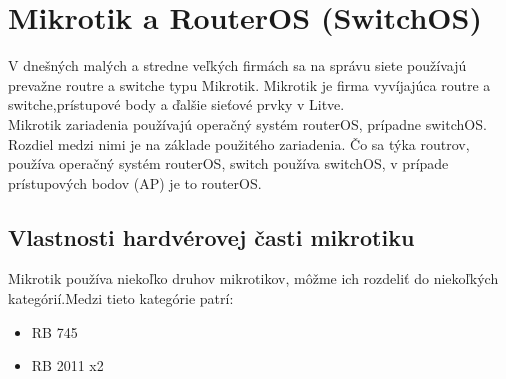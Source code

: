 \chapter{Mikrotik a RouterOS (SwitchOS)}
V dnešných malých  a stredne veľkých firmách sa na správu siete používajú prevažne routre a switche typu Mikrotik. Mikrotik je firma vyvíjajúca routre a switche,prístupové body a ďalšie sieťové prvky v Litve. \\
Mikrotik zariadenia používajú operačný systém routerOS, prípadne switchOS. Rozdiel medzi nimi je na základe použitého zariadenia. Čo sa týka routrov, používa operačný systém routerOS, switch používa switchOS, v prípade prístupových bodov (AP) je to routerOS. 
\section{Vlastnosti hardvérovej časti mikrotiku}
Mikrotik používa niekoľko druhov mikrotikov, môžme ich rozdeliť do niekoľkých kategórií.Medzi tieto kategórie patrí:
\begin{itemize}
\item RB 745
\item RB 2011 x2
\end{itemize} 